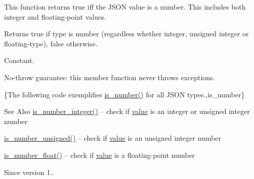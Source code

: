 This function returns true iff the J\-S\-O\-N value is a number. This includes both integer and floating-\/point values.

\begin{DoxyReturn}{Returns}
{\ttfamily true} if type is number (regardless whether integer, unsigned integer or floating-\/type), {\ttfamily false} otherwise.
\end{DoxyReturn}
Constant.

No-\/throw guarantee\-: this member function never throws exceptions.

\{The following code exemplifies {\ttfamily \hyperlink{classnlohmann_1_1basic__json_a957eb9594c7f0ca93212c30f3a400873}{is\-\_\-number()}} for all J\-S\-O\-N types.,is\-\_\-number\}

\begin{DoxySeeAlso}{See Also}
\hyperlink{classnlohmann_1_1basic__json_a435c93d06ef28f8003c31f62ffe4aed1}{is\-\_\-number\-\_\-integer()} -- check if \hyperlink{classnlohmann_1_1basic__json_a0a2cbbd95862a623e7dc5c37e67dead0}{value} is an integer or unsigned integer number 

\hyperlink{classnlohmann_1_1basic__json_aa388dc101bc285a98122a38fd2e3a9db}{is\-\_\-number\-\_\-unsigned()} -- check if \hyperlink{classnlohmann_1_1basic__json_a0a2cbbd95862a623e7dc5c37e67dead0}{value} is an unsigned integer number 

\hyperlink{classnlohmann_1_1basic__json_a7641371be8a347f3c1e05ac089a74c36}{is\-\_\-number\-\_\-float()} -- check if \hyperlink{classnlohmann_1_1basic__json_a0a2cbbd95862a623e7dc5c37e67dead0}{value} is a floating-\/point number
\end{DoxySeeAlso}
\begin{DoxySince}{Since}
version 1.. 
\end{DoxySince}
